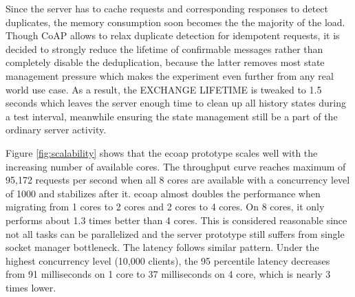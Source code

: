 Since the server has to cache requests and corresponding responses to detect duplicates, the memory consumption soon becomes the the majority of the load. Though CoAP allows to relax duplicate detection for idempotent requests, it is decided to strongly reduce the lifetime of confirmable messages rather than completely disable the deduplication, because the latter removes most state management pressure which makes the experiment even further from any real world use case. As a result, the EXCHANGE LIFETIME is tweaked to 1.5 seconds which leaves the server enough time to clean up all history states during a test interval, meanwhile ensuring the state management still be a part of the ordinary server activity.



Figure \ref{fig:scalability} shows that the ecoap prototype scales well with the increasing number of available cores. The throughput curve reaches maximum of 95,172 requests per second when all 8 cores are available with a concurrency level of 1000 and stabilizes after it. ecoap almost doubles the performance when migrating from 1 cores to 2 cores and 2 cores to 4 cores. On 8 cores, it only performs about 1.3 times better than 4 cores. This is considered reasonable since not all tasks can be parallelized and the server prototype still suffers from single socket manager bottleneck. The latency follows similar pattern. Under the highest concurrency level (10,000 clients), the 95 percentile latency decreases from 91 milliseconds on 1 core to 37 milliseconds on 4 core, which is nearly 3 times lower.

